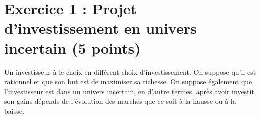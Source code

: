 \documentclass[12pt, a4paper]{exam}
\begin{document}
\section*{Exercice 1 : Projet d'investissement en univers incertain (5 points)}

Un investisseur à le choix en différent choix d'investissement. On suppose qu'il est rationnel et que son but est de maximiser sa richesse. On suppose également que l'investisseur est dans un univers incertain, en d'autre termes, après avoir investit son gains dépends de l'évolution des marchés que ce soit à la hausse ou à la baisse. 












\label{LastPage}
\end{document}
